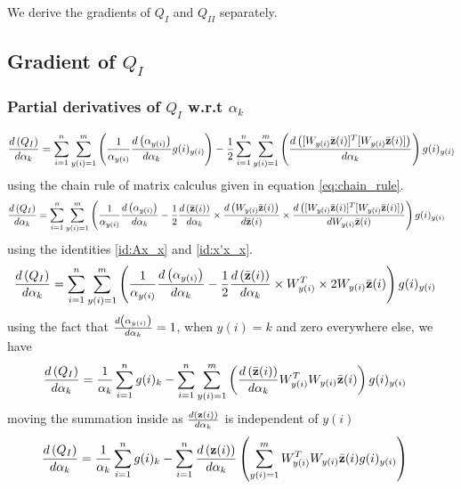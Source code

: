 \documentclass[]{article}
\begin{document}
We derive the gradients of $Q_I$ and $Q_{II}$ separately.
\\ 
\subsection{Gradient of $Q_I$}
\subsubsection*{Partial derivatives of $Q_I$ w.r.t $\alpha_k$}

\begin{align*}
\der{\alpha_k}{Q_I} = \sum\limits_{i=1}^n \sum\limits_{y(i)=1}^m \left( \frac{1}{\alpha_{y(i)}}\der{\alpha_k}{\alpha_{y(i)}} g(i)_{y(i)} \right) - \frac{1}{2} \sum\limits_{i=1}^n \sum\limits_{y(i)=1}^m \left( \der{\alpha_k}{ [W_{y(i)}\zbar{i}]^T [W_{y(i)}\zbar{i}] }\right) g(i)_{y(i)}
\end{align*}
using the chain rule of matrix calculus given in equation \ref{eq:chain_rule}.
\begin{align*}
\der{\alpha_k}{Q_I} &= \sum\limits_{i=1}^n \sum\limits_{y(i)=1}^m \left( \frac{1}{\alpha_{y(i)}}\der{\alpha_k}{\alpha_{y(i)}} -  \frac{1}{2} \der{\alpha_k}{\zbar{i}} \times \der{\zbar{i}}{W_{y(i)}\zbar{i}} \times \der{W_{y(i)}\zbar{i}} { [W_{y(i)}\zbar{i}]^T [W_{y(i)}\zbar{i}] }\right) g(i)_{y(i)}
\end{align*}
using the identities \ref{id:Ax_x} and \ref{id:x'x_x}.
\begin{align*}
&\der{\alpha_k}{Q_I} = \sum\limits_{i=1}^n \sum\limits_{y(i)=1}^m \left( \frac{1}{\alpha_{y(i)}}\der{\alpha_k}{\alpha_{y(i)}} -  \frac{1}{2} \der{\alpha_k}{\zbar{i}} \times W^T_{y(i)} \times 2W_{y(i)}\zbar{i}\right) g(i)_{y(i)}
\end{align*}
using the fact that $\der{\alpha_k}{\alpha_{y(i)}}=1$, when $y(i)=k$ and zero everywhere else, we have
\begin{align*}
\der{\alpha_k}{Q_I} &= \frac{1}{\alpha_k}\sum\limits_{i=1}^n  g(i)_k - \sum\limits_{i=1}^n \sum\limits_{y(i)=1}^m \left(\der{\alpha_k}{\zbar{i}} W^T_{y(i)}  W_{y(i)}\zbar{i}\right) g(i)_{y(i)}
\end{align*}
moving the summation inside as $\der{\alpha_k}{\textbf{z}(i)}$ is independent of $y(i)$
\begin{align*}
\der{\alpha_k}{Q_I} &= \frac{1}{\alpha_k}\sum\limits_{i=1}^n g(i)_k - \sum\limits_{i=1}^n \der{\alpha_k}{\textbf{z}(i)} \left(\sum\limits_{y(i)=1}^m  W^T_{y(i)}  W_{y(i)} \zbar{i} g(i)_{y(i)}\right) 
\end{align*}
\\
\end{document}
